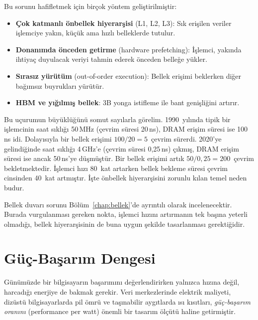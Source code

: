 Bu sorunu hafifletmek için birçok yöntem geliştirilmiştir:
\begin{itemize}
    \item \textbf{Çok katmanlı önbellek hiyerarşisi} (L1, L2, L3): Sık erişilen veriler işlemciye yakın, küçük ama hızlı belleklerde tutulur.
    \item \textbf{Donanımda önceden getirme} (hardware prefetching): İşlemci, yakında ihtiyaç duyulacak veriyi tahmin ederek önceden belleğe yükler.
    \item \textbf{Sırasız yürütüm} (out-of-order execution): Bellek erişimi beklerken diğer bağımsız buyrukları yürütür.
    \item \textbf{HBM ve yığılmış bellek}: 3B yonga istifleme ile bant genişliğini artırır.
\end{itemize}

Bu uçurumun büyüklüğünü somut sayılarla görelim. 1990~yılında tipik bir işlemcinin saat sıklığı 50\,MHz (çevrim süresi 20\,ns), DRAM erişim süresi ise 100\,ns idi. Dolayısıyla bir bellek erişimi $100/20 = 5$~çevrim sürerdi. 2020'ye gelindiğinde saat sıklığı 4\,GHz'e (çevrim süresi 0,25\,ns) çıkmış, DRAM erişim süresi ise ancak 50\,ns'ye düşmüştür. Bir bellek erişimi artık $50/0{,}25 = 200$~çevrim bekletmektedir. İşlemci hızı 80~kat artarken bellek bekleme süresi çevrim cinsinden 40~kat artmıştır. İşte önbellek hiyerarşisini zorunlu kılan temel neden budur.

Bellek duvarı sorunu Bölüm~\ref{chap:bellek}'de ayrıntılı olarak incelenecektir. Burada vurgulanması gereken nokta, işlemci hızını artırmanın tek başına yeterli olmadığı, bellek hiyerarşisinin de buna uygun şekilde tasarlanması gerektiğidir.


\section{Güç-Başarım Dengesi}
\label{sec:guc-basarim}

Günümüzde bir bilgisayarın başarımını değerlendirirken yalnızca hızına değil, harcadığı enerjiye de bakmak gerekir. Veri merkezlerinde elektrik maliyeti, dizüstü bilgisayarlarda pil ömrü ve taşınabilir aygıtlarda ısı kısıtları, \emph{güç-başarım oranını} (performance per watt) önemli bir tasarım ölçütü haline getirmiştir.

